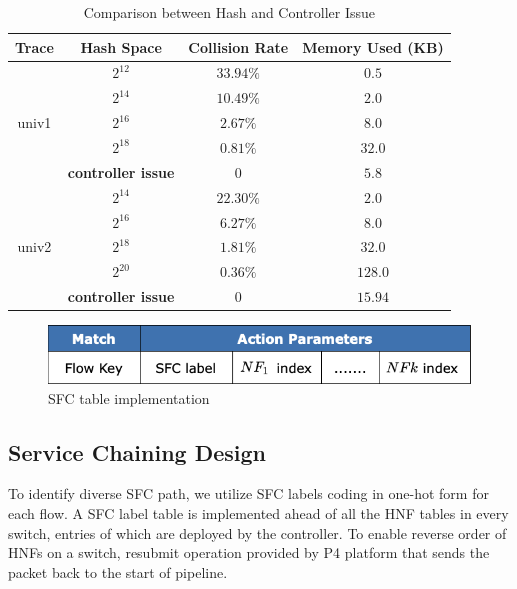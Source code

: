 \documentclass[10pt, conference, letterpaper]{IEEEtran}
\begin{document}
\begin{table}[t]
\caption{Comparison between Hash and Controller Issue}
\begin{center}
\begin{tabular}{|c|c|c|c|}
\hline
\textbf{Trace}&\textbf{Hash Space}&\textbf{Collision Rate}&\textbf{Memory Used (KB)}\\
\hline
\multirow{5}{*}{univ1} & $2^{12}$ & $33.94\%$ & $0.5$ \\
\cline{2-4}
~ & $2^{14}$ & $10.49\%$ & $2.0$ \\
\cline{2-4}
~ & $2^{16}$ & $2.67\%$ & $8.0$ \\
\cline{2-4}
~ & $2^{18}$ & $0.81\%$ & $32.0$ \\
\cline{2-4}
~ & \textbf{controller issue} & $0$ & $5.8$ \\
\hline
\multirow{5}{*}{univ2} & $2^{14}$ & $22.30\%$ & $2.0$ \\
\cline{2-4}
~ & $2^{16}$ & $6.27\%$ & $8.0$ \\
\cline{2-4}
~ & $2^{18}$ & $1.81\%$ & $32.0$ \\
\cline{2-4}
~ & $2^{20}$ & $0.36\%$ & $128.0$ \\
\cline{2-4}
~ & \textbf{controller issue} & $0$ & $15.94$ \\
\hline
\end{tabular}
\label{hash}
\end{center}
\end{table}

\begin{figure}[t]
\centerline{\includegraphics[scale=0.3]{src/sfc.png}}
\caption{SFC table implementation}
\label{sfc}
\end{figure}


\subsection{Service Chaining Design}
To identify diverse SFC path, we utilize SFC labels coding in one-hot form for each flow. A SFC label table is implemented ahead of all the HNF tables in every switch, entries of which are deployed by the controller. To enable reverse order of HNFs on a switch, resubmit operation provided by P4 platform that sends the packet back to the start of pipeline.
\end{document}
